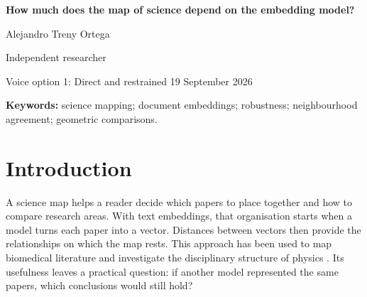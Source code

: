 \documentclass[12pt]{article}
\begin{document}
\begin{center}
{\LARGE\bfseries How much does the map of science depend on the embedding model?\par}
\vspace{12pt}
{\large Alejandro Treny Ortega\par}
\smallskip
Independent researcher\par
\medskip
{\small Voice option 1: Direct and restrained \textbullet{} 19 September 2026\par}
\end{center}

\begin{abstract}
A science map is useful only if its conclusions can be interpreted with some confidence in how the map was made. Here, ten embedding models represent the same fixed corpus of 500,000 OpenAlex records from 26 fields and 2000--2024. Matched panels compare field centres, internal structure and nearest neighbours, then vary text input and representation settings. Broad structure is shared, but models retain only 30.3\% of the 25 nearest neighbours on average within field-period groups. Removing abstracts changes neighbours about as much as changing the model; removing titles changes less. An exploratory comparison of all 325 field pairs finds persistent opposite orderings across models in 262 pairs for angular spread and 221 for effective linear dimension. Requiring relative differences above 5\% leaves 96 and 177. Alternative measures preserve many oppositions, while centring and pooling affect their persistence. These are geometric findings, without an external test of thematic correctness. A comparison can survive repeated article selection and still reverse when the model changes. Robustness assessment should follow the particular conclusion drawn from a science map, alongside its overall agreement with other maps.
\end{abstract}
\textbf{Keywords:} science mapping; document embeddings; robustness; neighbourhood agreement; geometric comparisons.

\section{Introduction}
A science map helps a reader decide which papers to place together and how to compare research areas. With text embeddings, that organisation starts when a model turns each paper into a vector. Distances between vectors then provide the relationships on which the map rests. This approach has been used to map biomedical literature and investigate the disciplinary structure of physics \citep{refbe130e2973,refc0e2cc29e0}. Its usefulness leaves a practical question: if another model represented the same papers, which conclusions would still hold?
\end{document}
